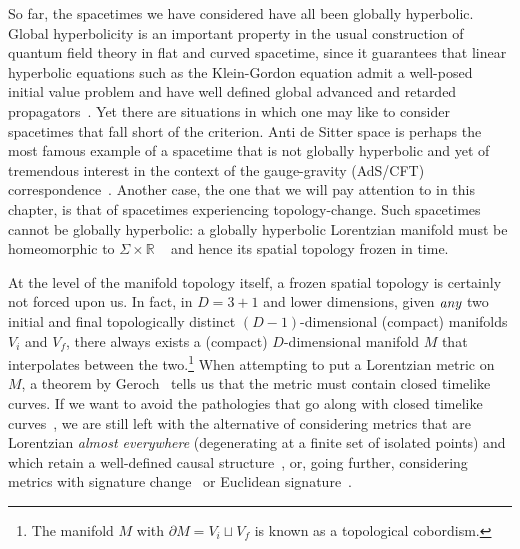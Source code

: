 \documentclass[12pt]{article}
\begin{document}
So far, the spacetimes we have considered have all been globally hyperbolic. Global hyperbolicity is an important property in the usual construction of quantum field theory in flat and curved spacetime, since it guarantees that linear hyperbolic equations such as the Klein-Gordon equation admit a well-posed initial value problem and have well defined global advanced and retarded propagators~\cite{leray1953hyperbolic,hawking1975large}. Yet there are situations in which one may like to consider spacetimes that fall short of the criterion. Anti de Sitter space is perhaps the most famous example of a spacetime that is not globally hyperbolic and yet of tremendous interest in the context of the gauge-gravity (AdS/CFT) correspondence~\cite{Avis:1977yn}. Another case, the one that we will pay attention to in this chapter, is that of spacetimes experiencing topology-change. Such spacetimes cannot be globally hyperbolic: a globally hyperbolic Lorentzian manifold must be homeomorphic to $\Sigma\times\mathbb R$ ~\cite{Geroch:1970uw} and hence its spatial topology frozen in time.

At the level of the manifold topology itself, a frozen spatial topology is certainly not forced upon us. In fact, in $D=3+1$ and lower dimensions, given $\emph{any}$ two initial and final topologically distinct $(D-1)$-dimensional (compact) manifolds $V_i$ and $V_f$, there always exists a (compact) $D$-dimensional manifold $M$ that interpolates between the two.\footnote{The manifold $M$ with $\partial M = V_i \sqcup V_f$ is known as a topological cobordism.} When attempting to put a Lorentzian metric on $M$, a theorem by Geroch~\cite{Geroch:1967fs} tells us that the metric must contain closed timelike curves. If we want to avoid the %
pathologies that go along with closed timelike curves~\cite{Sorkin:1997gi,thorne1993closed}, we are still left with the alternative of considering metrics that are Lorentzian \emph{almost everywhere} (degenerating at a finite set of isolated points) and which retain a well-defined causal structure~\cite{Sorkin:1989ea}, or, going further, considering metrics with signature change~\cite{Dray:1991zz} or Euclidean signature~\cite{Gibbons:2011dh}.
\end{document}
